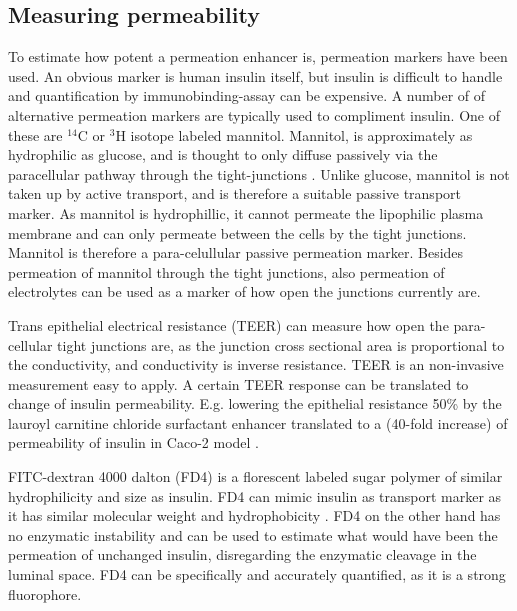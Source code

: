 \subsection{Measuring permeability}
To estimate how potent a permeation enhancer is, permeation markers have been used. An obvious marker is human insulin itself, but insulin is difficult to handle and quantification by immunobinding-assay can be expensive. A number of of alternative permeation markers are typically used to compliment insulin. One of these are $^{14}$C or $^3$H isotope labeled mannitol. Mannitol, is approximately as hydrophilic as glucose, and is thought to only diffuse passively via the paracellular pathway through the tight-junctions \cite{anderberg1992epithelial,artursson1994effect}. Unlike glucose, mannitol is not taken up by active transport, and is therefore a suitable passive transport marker. As mannitol is hydrophillic, it cannot permeate the lipophilic plasma membrane and can only permeate between the cells by the tight junctions. Mannitol is therefore a para-celullular passive permeation marker. Besides permeation of mannitol through the tight junctions, also permeation of electrolytes can be used as a marker of how open the junctions currently are.

Trans epithelial electrical resistance (TEER) can measure how open the para-cellular tight junctions are, as the junction cross sectional area is proportional to the conductivity, and conductivity is inverse resistance. TEER is an non-invasive measurement easy to apply. A certain TEER response can be translated to change of insulin permeability. E.g. lowering the epithelial resistance 50\% by the lauroyl carnitine chloride surfactant enhancer translated to a (40-fold increase) of permeability of insulin in Caco-2 model \cite{welling2014citric}.

FITC-dextran 4000 dalton (FD4) is a florescent labeled sugar polymer of similar hydrophilicity and size as insulin. FD4 can mimic insulin as transport marker as it has similar molecular weight and hydrophobicity \cite{vernon1999insulin}. FD4 on the other hand has no enzymatic instability and can be used to estimate what would have been the permeation of unchanged insulin, disregarding the enzymatic cleavage in the luminal space. FD4 can be specifically and accurately quantified, as it is a strong fluorophore.

